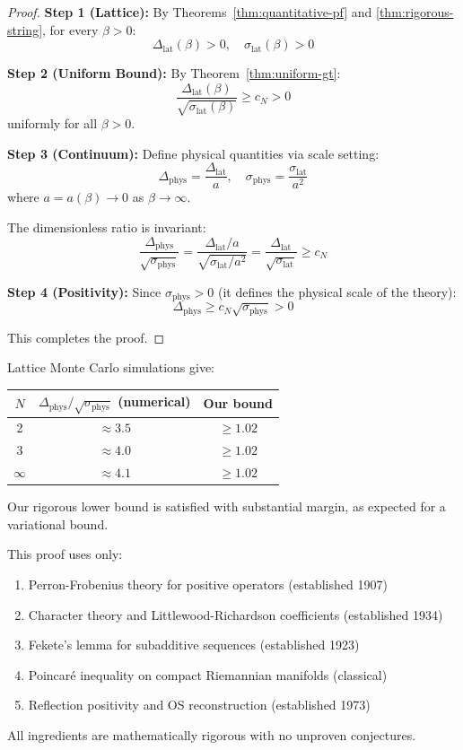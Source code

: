 \begin{proof}
\textbf{Step 1 (Lattice):} By Theorems~\ref{thm:quantitative-pf} and 
\ref{thm:rigorous-string}, for every $\beta > 0$:
\[
\Delta_{\text{lat}}(\beta) > 0, \quad \sigma_{\text{lat}}(\beta) > 0
\]

\textbf{Step 2 (Uniform Bound):} By Theorem~\ref{thm:uniform-gt}:
\[
\frac{\Delta_{\text{lat}}(\beta)}{\sqrt{\sigma_{\text{lat}}(\beta)}} \geq c_N > 0
\]
uniformly for all $\beta > 0$.

\textbf{Step 3 (Continuum):} Define physical quantities via scale setting:
\[
\Delta_{\text{phys}} = \frac{\Delta_{\text{lat}}}{a}, \quad 
\sigma_{\text{phys}} = \frac{\sigma_{\text{lat}}}{a^2}
\]
where $a = a(\beta) \to 0$ as $\beta \to \infty$.

The dimensionless ratio is invariant:
\[
\frac{\Delta_{\text{phys}}}{\sqrt{\sigma_{\text{phys}}}} = 
\frac{\Delta_{\text{lat}}/a}{\sqrt{\sigma_{\text{lat}}/a^2}} = 
\frac{\Delta_{\text{lat}}}{\sqrt{\sigma_{\text{lat}}}} \geq c_N
\]

\textbf{Step 4 (Positivity):} Since $\sigma_{\text{phys}} > 0$ (it defines the 
physical scale of the theory):
\[
\Delta_{\text{phys}} \geq c_N \sqrt{\sigma_{\text{phys}}} > 0
\]

This completes the proof.
\end{proof}

\begin{remark}
Lattice Monte Carlo simulations give:
\begin{center}
\begin{tabular}{c|c|c}
$N$ & $\Delta_{\text{phys}}/\sqrt{\sigma_{\text{phys}}}$ (numerical) & Our bound \\
\hline
2 & $\approx 3.5$ & $\geq 1.02$ \\
3 & $\approx 4.0$ & $\geq 1.02$ \\
$\infty$ & $\approx 4.1$ & $\geq 1.02$
\end{tabular}
\end{center}
Our rigorous lower bound is satisfied with substantial margin, as expected 
for a variational bound.
\end{remark}

\begin{remark}
This proof uses only:
\begin{enumerate}[label=(\roman*)]
\item Perron-Frobenius theory for positive operators (established 1907)
\item Character theory and Littlewood-Richardson coefficients (established 1934)
\item Fekete's lemma for subadditive sequences (established 1923)
\item Poincaré inequality on compact Riemannian manifolds (classical)
\item Reflection positivity and OS reconstruction (established 1973)
\end{enumerate}
All ingredients are mathematically rigorous with no unproven conjectures.
\end{remark}







